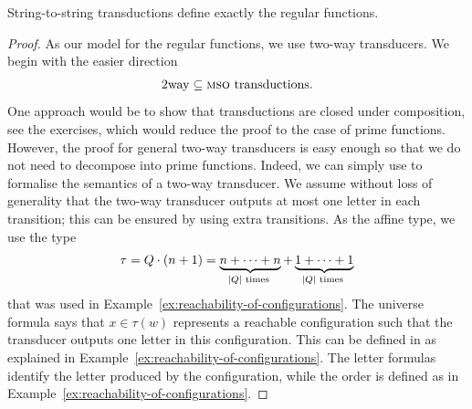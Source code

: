 \begin{theorem}\label{thm:logic-regular-functions}
    String-to-string \mso transductions define exactly the regular functions.
\end{theorem}

\begin{proof} As our model for the regular functions, we use two-way transducers. 
    We begin with the easier direction 
    \begin{align*}
    \mathrm{2way} \subseteq {\textsc{mso}} \text{ transductions}.
    \end{align*}
One approach would be to show that \mso transductions are closed under composition, see the exercises, which would reduce the proof to the case of prime functions. However, the proof for general two-way transducers is easy enough so that we do not need to decompose into prime functions. Indeed, we can simply use \mso to formalise the semantics of a two-way transducer. We assume without loss of generality that the two-way transducer outputs at most one letter in each transition; this can be ensured by using extra transitions.  As the affine type, we use the type 
    \begin{align*}
    \tau = Q \cdot (n +1) = 
    \myunderbrace{n + \cdots + n}{$|Q|$ times} + 
    \myunderbrace{1 + \cdots + 1}{$|Q|$ times}
    \end{align*}
    that was used in Example~\ref{ex:reachability-of-configurations}. The universe formula says that $x \in \tau(w)$ represents a reachable configuration such that the transducer outputs one letter in this configuration. This can be defined in \mso as explained in Example~\ref{ex:reachability-of-configurations}. The letter formulas identify the letter produced by the configuration, while the order is defined as in Example~\ref{ex:reachability-of-configurations}.


\end{proof}
